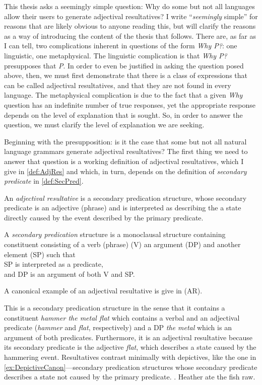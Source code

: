 \documentclass[MilwayThesis]{subfiles}
\begin{document}
This thesis asks a seemingly simple question: Why do some but not all languages allow their users to generate adjectival resultatives?
I write ``\textit{seemingly} simple'' for reasons that are likely obvious to anyone reading this, but will clarify the reasons as a way of introducing the content of the thesis that follows.
There are, as far as I can tell, two complications inherent in questions of the form \textit{Why P?}: one linguistic, one metaphysical.
The linguistic complication is that \textit{Why P?} presupposes that \textit{P}.
In order to even be justified in asking the question posed above, then, we must first demonstrate that there is a class of expressions that can be called adjectival resultatives, and that they are not found in every language.
The metaphysical complication is due to the fact that a given \textit{Why} question has an indefinite number of true responses, yet the appropriate response depends on the level of explanation that is sought.
So, in order to answer the question, we must clarify the level of explanation we are seeking.

Beginning with the presupposition: is it the case that some but not all natural language grammars generate adjectival resultatives?
The first thing we need to answer that question is a working definition of adjectival resultatives, which I give in \cref{def:AdjRes} and which, in turn, depends on the definition of \textit{secondary predicate} in \cref{def:SecPred}.
\begin{defn}\label{def:AdjRes}
	An \textit{adjectival resultative} is a secondary predication structure, whose secondary predicate is an adjective (phrase) and is interpreted as describing the a state directly caused by the event described by the primary predicate.
\end{defn}
\begin{defn}\label{def:SecPred}
	A \textit{secondary predication} structure is a monoclausal structure containing constituent consisting of a verb (phrase) (V) an argument (DP) and another element (SP) such that\\
	SP is interpreted as a predicate,\\
	and DP is an argument of both V and SP.
\end{defn}

A canonical example of an adjectival resultative is give in (AR).
\AREx

This is a secondary predication structure in the sense that it contains a constituent \textit{hammer the metal flat} which contains a verbal and an adjectival predicate (\textit{hammer} and \textit{flat}, respectively) and a DP \textit{the metal} which is an argument of both predicates.
Furthermore, it is an adjectival resultative because its secondary predicate is the adjective \textit{flat}, which describes a state caused by the hammering event.
Resultatives contrast minimally with depictives, like the one in \cref{ex:DepictiveCanon}---secondary predication structures whose secondary predicate describes a state not caused by the primary predicate.
\ex.\label{ex:DepictiveCanon} Heather ate the fish raw.
\end{document}
